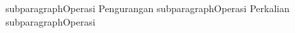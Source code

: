       subparagraph{Operasi Pengurangan}
      subparagraph{Operasi Perkalian}
      subparagraph{Operasi }

